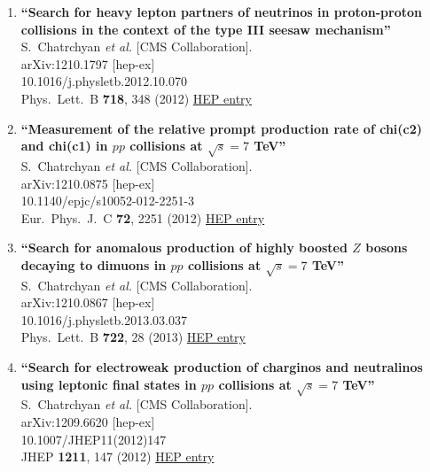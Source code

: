 \documentclass{article}
\begin{document}
\begin{enumerate}
\item%
{\bf ``Search for heavy lepton partners of neutrinos in proton-proton collisions in the context of the type III seesaw mechanism''}
  \\{}S.~Chatrchyan {\it et al.} [CMS Collaboration].
  \\{}arXiv:1210.1797 [hep-ex]
    \\{}10.1016/j.physletb.2012.10.070
\\{}Phys.\ Lett.\ B {\bf 718}, 348 (2012) %
\href{http://inspirehep.net/record/1189663}{HEP entry}


\item%
{\bf ``Measurement of the relative prompt production rate of chi(c2) and chi(c1) in $pp$ collisions at $\sqrt{s}=7$ TeV''}
  \\{}S.~Chatrchyan {\it et al.} [CMS Collaboration].
  \\{}arXiv:1210.0875 [hep-ex]
    \\{}10.1140/epjc/s10052-012-2251-3
\\{}Eur.\ Phys.\ J.\ C {\bf 72}, 2251 (2012) %
\href{http://inspirehep.net/record/1189050}{HEP entry}


\item%
{\bf ``Search for anomalous production of highly boosted $Z$ bosons decaying to dimuons in $pp$ collisions at $\sqrt{s}=7$ TeV''}
  \\{}S.~Chatrchyan {\it et al.} [CMS Collaboration].
  \\{}arXiv:1210.0867 [hep-ex]
    \\{}10.1016/j.physletb.2013.03.037
\\{}Phys.\ Lett.\ B {\bf 722}, 28 (2013) %
\href{http://inspirehep.net/record/1189049}{HEP entry}


\item%
{\bf ``Search for electroweak production of charginos and neutralinos using leptonic final states in $pp$ collisions at $\sqrt{s}=7$ TeV''}
  \\{}S.~Chatrchyan {\it et al.} [CMS Collaboration].
  \\{}arXiv:1209.6620 [hep-ex]
    \\{}10.1007/JHEP11(2012)147
\\{}JHEP {\bf 1211}, 147 (2012) %
\href{http://inspirehep.net/record/1188683}{HEP entry}



\end{enumerate}
\end{document}
